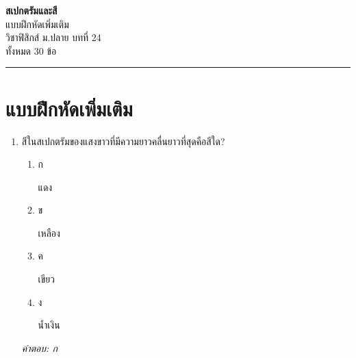\documentclass[12pt]{article}
\begin{document}
\begin{center}
{\Large\textbf{สเปกตรัมและสี}}\\[6pt]
{\normalsize แบบฝึกหัดเพิ่มเติม}\\[6pt]
{\normalsize วิชาฟิสิกส์ ม.ปลาย บทที่ 24}\\[4pt]
{\footnotesize ทั้งหมด 30 ข้อ}
\end{center}
\hrule
\bigskip

\section*{แบบฝึกหัดเพิ่มเติม}
\begin{enumerate}[label=\arabic*., itemsep=0.5\baselineskip, topsep=0.5\baselineskip, leftmargin=*]
\item สีในสเปกตรัมของแสงขาวที่มีความยาวคลื่นยาวที่สุดคือสีใด?
\begin{enumerate}[label=\alph*)., itemsep=0.3\baselineskip, topsep=0.3\baselineskip]
\item ก\ 
\begin{minipage}[t]{0.9\linewidth}
\raggedright แดง
\end{minipage}
\item ข\ 
\begin{minipage}[t]{0.9\linewidth}
\raggedright เหลือง
\end{minipage}
\item ค\ 
\begin{minipage}[t]{0.9\linewidth}
\raggedright เขียว
\end{minipage}
\item ง\ 
\begin{minipage}[t]{0.9\linewidth}
\raggedright น้ำเงิน
\end{minipage}
\end{enumerate}
\vspace{-0.3\baselineskip}
\begin{small}
\textit{คำตอบ: ก}
\end{small}


\end{enumerate}
\end{document}
